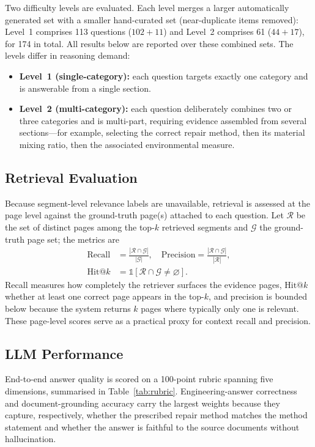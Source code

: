 \documentclass[10pt,a4paper,conference]{IEEEtran}
\begin{document}
Two difficulty levels are evaluated. Each level merges a larger automatically
generated set with a smaller hand-curated set (near-duplicate items removed):
Level~1 comprises 113 questions ($102+11$) and Level~2 comprises 61 ($44+17$),
for 174 in total. All results below are reported over these combined sets. The
levels differ in reasoning demand:
\begin{itemize}
\item \textbf{Level~1 (single-category):} each question targets exactly one
category and is answerable from a single section.
\item \textbf{Level~2 (multi-category):} each question deliberately combines two
or three categories and is multi-part, requiring evidence assembled from several
sections---for example, selecting the correct repair method, then its material
mixing ratio, then the associated environmental measure.
\end{itemize}

\subsection{Retrieval Evaluation}
Because segment-level relevance labels are unavailable, retrieval is assessed at
the page level against the ground-truth page(s) attached to each question. Let
$\mathcal{R}$ be the set of distinct pages among the top-$k$ retrieved segments
and $\mathcal{G}$ the ground-truth page set; the metrics are
{\small
\begin{equation}
\begin{aligned}
\mathrm{Recall} &= \frac{|\mathcal{R}\cap\mathcal{G}|}{|\mathcal{G}|}, \quad
\mathrm{Precision} = \frac{|\mathcal{R}\cap\mathcal{G}|}{|\mathcal{R}|}, \\[2pt]
\mathrm{Hit@}k &= \mathbb{1}\!\left[\mathcal{R}\cap\mathcal{G}\neq\varnothing\right].
\end{aligned}
\label{eq:pr}
\end{equation}
}
Recall measures how completely the retriever surfaces the evidence pages,
$\mathrm{Hit@}k$ whether at least one correct page appears in the top-$k$, and
precision is bounded below because the system returns $k$ pages where typically
only one is relevant. These page-level scores serve as a practical proxy for
context recall and precision.

\subsection{LLM Performance}
End-to-end answer quality is scored on a 100-point rubric spanning five
dimensions, summarised in Table~\ref{tab:rubric}. Engineering-answer
correctness and document-grounding accuracy carry the largest weights because
they capture, respectively, whether the prescribed repair method matches the
method statement and whether the answer is faithful to the source documents
without hallucination.
\end{document}
